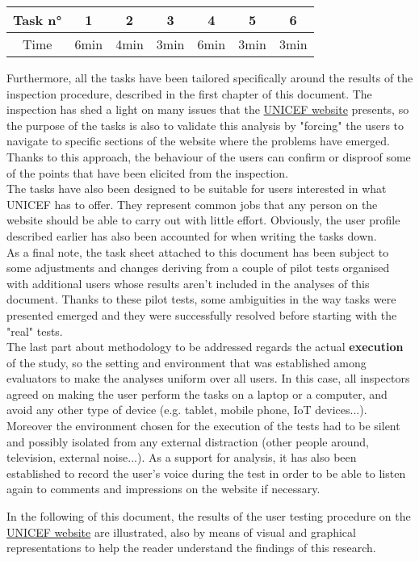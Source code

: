 \vspace{0.5cm}

{
	\renewcommand{\arraystretch}{1.45}
	\setlength{\tabcolsep}{0.5cm}
	\centering 
\begin{tabular}{c| c c c c c c}
	Task n° &1 & 2 & 3 & 4 & 5 & 6\\
	\hline
	Time & 6min & 4min & 3min & 6min & 3min & 3min
	
\end{tabular}

}

\vspace{0.5cm}

Furthermore, all the tasks have been tailored specifically around the results of the inspection procedure, described in the first chapter of this document. The inspection has shed a light on many issues that the \href{https://www.unicef.org/}{UNICEF website} presents, so the purpose of the tasks is also to validate this analysis by "forcing" the users to navigate to specific sections of the website where the problems have emerged. Thanks to this approach, the behaviour of the users can confirm or disproof some of the points that have been elicited from the inspection.\\
The tasks have also been designed to be suitable for users interested in what UNICEF has to offer. They represent common jobs that any person on the website should be able to carry out with little effort. Obviously, the user profile described earlier has also been accounted for when writing the tasks down.\\
As a final note, the task sheet attached to this document has been subject to some adjustments and changes deriving from a couple of pilot tests organised with additional users whose results aren't included in the analyses of this document. Thanks to these pilot tests, some ambiguities in the way tasks were presented emerged and they were successfully resolved before starting with the "real" tests.\\

The last part about methodology to be addressed regards the actual \textbf{execution} of the study, so the setting and environment that was established among evaluators to make the analyses uniform over all users.
In this case, all inspectors agreed on making the user perform the tasks on a laptop or a computer, and avoid any other type of device (e.g. tablet, mobile phone, IoT devices...). Moreover the environment chosen for the execution of the tests had to be silent and possibly isolated from any external distraction (other people around, television, external noise...).
As a support for analysis, it has also been established to record the user's voice during the test in order to be able to listen again to comments and impressions on the website if necessary.

In the following of this document, the results of the user testing procedure on the \href{https://www.unicef.org/}{UNICEF website} are illustrated, also by means of visual and graphical representations to help the reader understand the findings of this research.
	

